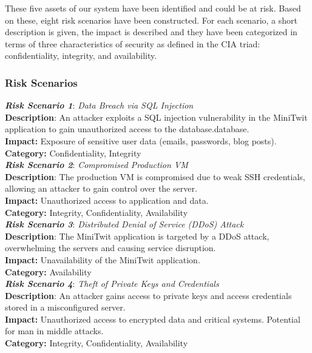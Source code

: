 \documentclass{article}
\begin{document}
These five assets of our system have been identified and could be at risk. Based on these, eight risk scenarios have been constructed. For each scenario, a short description is given, the impact is described and they have been categorized in terms of three characteristics of security as defined in the CIA triad: confidentiality, integrity, and availability.

\begin{multicols}{2}

\subsubsection{Risk Scenarios}
\textit{\textbf{Risk Scenario 1}}: \textit{Data Breach via SQL Injection} \\
\textbf{Description}: An attacker exploits a SQL injection vulnerability in the MiniTwit application to gain unauthorized access to the database.database.\\
\textbf{Impact:} Exposure of sensitive user data (emails, passwords, blog posts).\\
\textbf{Category:} Confidentiality, Integrity\\

\textit{\textbf{Risk Scenario 2}}: \textit{Compromised Production VM} \\
\textbf{Description}: The production VM is compromised due to weak SSH credentials, allowing an attacker to gain control over the server.\\
\textbf{Impact:} Unauthorized access to application and data.\\
\textbf{Category:}  Integrity, Confidentiality, Availability \\

\textit{\textbf{Risk Scenario 3}}: \textit{Distributed Denial of Service (DDoS) Attack} \\
\textbf{Description}: The MiniTwit application is targeted by a DDoS attack, overwhelming the servers and causing service disruption.\\
\textbf{Impact:} Unavailability of the MiniTwit application.\\
\textbf{Category:} Availability \\

\textit{\textbf{Risk Scenario 4}}: \textit{Theft of Private Keys and Credentials} \\
\textbf{Description}: An attacker gains access to private keys and access credentials stored in a misconfigured server.\\
\textbf{Impact:}  Unauthorized access to encrypted data and critical systems. Potential for man in middle attacks.\\
\textbf{Category:} Integrity, Confidentiality, Availability \\


\end{multicols}
\end{document}
